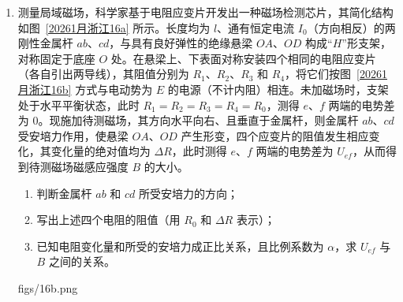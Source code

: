 \documentclass[\gkver]{gaokaozhenti}
\begin{document}
\begin{enumerate}
{即气体对外做的功 $2.05\UJ$。
}

\item
测量局域磁场，科学家基于电阻应变片开发出一种磁场检测芯片，其简化结构如图~\ref{20261月浙江16a} 所示。长度均为 $l$、通有恒定电流 $I_{0}$（方向相反）的两刚性金属杆 $ab$、$cd$，与具有良好弹性的绝缘悬梁 $OA$、$OD$ 构成“$H$”形支架，对称固定于底座 $O$ 处。在悬梁上、下表面对称安装四个相同的电阻应变片（各自引出两导线），其阻值分别为 $R_{1}$、$R_{2}$、$R_{3}$ 和 $R_{4}$，将它们按图~\ref{20261月浙江16b} 方式与电动势为 $E$ 的电源（不计内阻）相连。未加磁场时，支架处于水平平衡状态，此时 $R_{1} = R_{2} = R_{3} = R_{4} = R_{0}$，测得 $e$、$f$ 两端的电势差为 0。现施加待测磁场，其方向水平向右、且垂直于金属杆，则金属杆 $ab$、$cd$ 受安培力作用，使悬梁 $OA$、$OD$ 产生形变，四个应变片的阻值发生相应变化，其变化量的绝对值均为 $\Delta R$，此时测得 $e$、$f$ 两端的电势差为 $U_{ef}$，从而得到待测磁场磁感应强度 $B$ 的大小。
\begin{enumerate}
	\item
	判断金属杆 $ab$ 和 $cd$ 所受安培力的方向；
	\item
	写出上述四个电阻的阻值（用 $R_{0}$ 和 $\Delta R$ 表示）；
	\item
	已知电阻变化量和所受的安培力成正比关系，且比例系数为 $\alpha$，求 $U_{ef}$ 与 $B$ 之间的关系。
\end{enumerate}
{figs/16b.png}
\end{enumerate}
\end{document}
